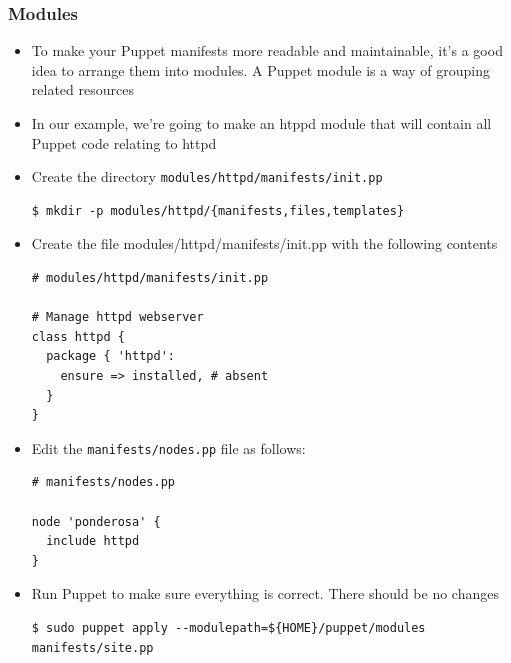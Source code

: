 \documentclass{beamer}
\begin{document}
\begin{frame}[fragile]
\frametitle{Modules}
\begin{itemize}
\item To make your Puppet manifests more readable and maintainable, it's a good idea to arrange
them into modules. A Puppet module is a way of grouping related resources
\item In our example, we're going to make an htppd module that will contain all Puppet code relating to httpd

\item Create the directory \texttt{modules/httpd/manifests/init.pp}
\lstset{language=shell}
\begin{lstlisting}[escapechar=&]
$ mkdir -p modules/httpd/{manifests,files,templates}
\end{lstlisting}

\item Create the file modules/httpd/manifests/init.pp with the following
contents

\lstset{language=shell}
\begin{lstlisting}[escapechar=&]
# modules/httpd/manifests/init.pp

# Manage httpd webserver
class httpd {
  package { 'httpd':
    ensure => installed, # absent
  }
}
\end{lstlisting}

\item Edit the \texttt{manifests/nodes.pp} file as follows:
\lstset{language=shell}
\begin{lstlisting}[escapechar=&]
# manifests/nodes.pp

node 'ponderosa' {
  include httpd
}
\end{lstlisting}

\item Run Puppet to make sure everything is correct. There should be no changes
\begin{lstlisting}[escapechar=&]
$ sudo puppet apply --modulepath=${HOME}/puppet/modules manifests/site.pp
\end{lstlisting}
\end{itemize}

\end{frame}
\end{document}

